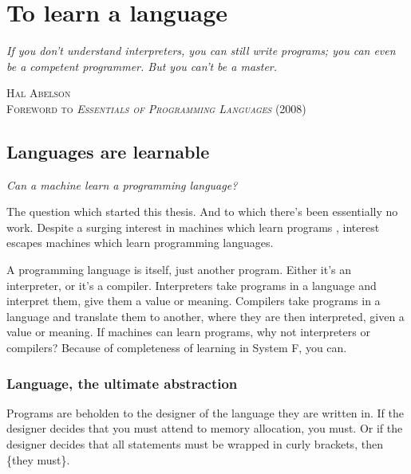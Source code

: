 \chapter{To learn a language}
\begin{singlespace}
\setlength{\epigraphwidth}{0.6\textwidth}
\epigraph{\textit{If you don't understand interpreters, you can still write programs; you can even be a competent programmer. But you can't be a master.}}{\textsc{Hal Abelson \\  Foreword to \textit{Essentials of Programming Languages} (2008)}}
\end{singlespace}

\section{Languages are learnable}

\begin{displayquote}
\begin{singlespace}
\centering
\textit{Can a machine learn a programming language?}
\end{singlespace}
\end{displayquote}


The question which started this thesis. And to which there's been essentially no work. Despite a surging interest in machines which learn programs \cite{gulwani2017program}, interest escapes machines which learn programming languages. 

A programming language is itself, just another program. Either it's an interpreter, or it's a compiler. Interpreters take programs in a language and interpret them, give them a value or meaning. Compilers take programs in a language and translate them to another, where they are then interpreted, given a value or meaning. If machines can learn programs, why not interpreters or compilers? Because of completeness of learning in System F, you can.

\subsection{Language, the ultimate abstraction}

Programs are beholden to the designer of the language they are written in. If the designer decides that you must attend to memory allocation, you must. Or if the designer decides that all statements must be wrapped in curly brackets, then \{they must\}.

